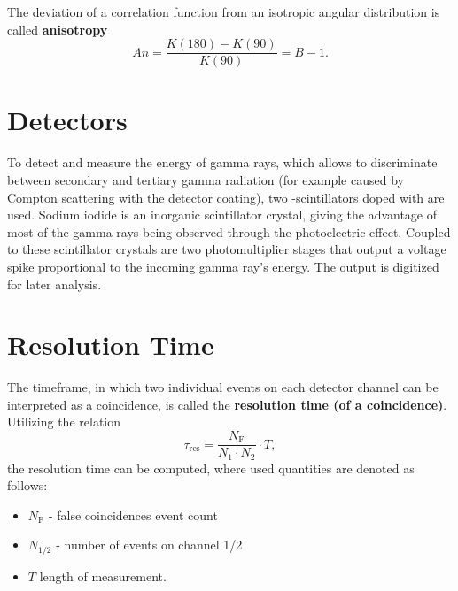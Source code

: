 The deviation of a correlation function from an isotropic angular distribution is called \textbf{anisotropy}
\begin{equation}\label{eq:aniso}
	An=\frac{K(180)-K(90)}{K(90)}=B-1.
\end{equation}

\section{Detectors}\label{sec:detectors}
To detect and measure the energy of gamma rays, which allows to discriminate between secondary and tertiary gamma radiation (for example caused by Compton scattering with the detector coating), two -scintillators doped with  are used.
Sodium iodide is an inorganic scintillator crystal, giving the advantage of most of the gamma rays being observed through the photoelectric effect.
Coupled to these scintillator crystals are two photomultiplier stages that output a voltage spike proportional to the incoming gamma ray's energy.
The output is digitized for later analysis.

\section{Resolution Time}
The timeframe, in which two individual events on each detector channel can be interpreted as a coincidence, is called the \textbf{resolution time (of a coincidence)}.
Utilizing the relation
\begin{equation}\label{eq:res_time}
	\tau_\text{res}=\frac{N_\text{F}}{N_1\cdot N_2}\cdot T,
\end{equation}
the resolution time can be computed, where used quantities are denoted as follows:
\begin{itemize}
	\item $N_\text{F}$ - false coincidences event count
	\item $N_{1/2}$ - number of events on channel 1/2
	\item $T$ length of measurement.
\end{itemize}
